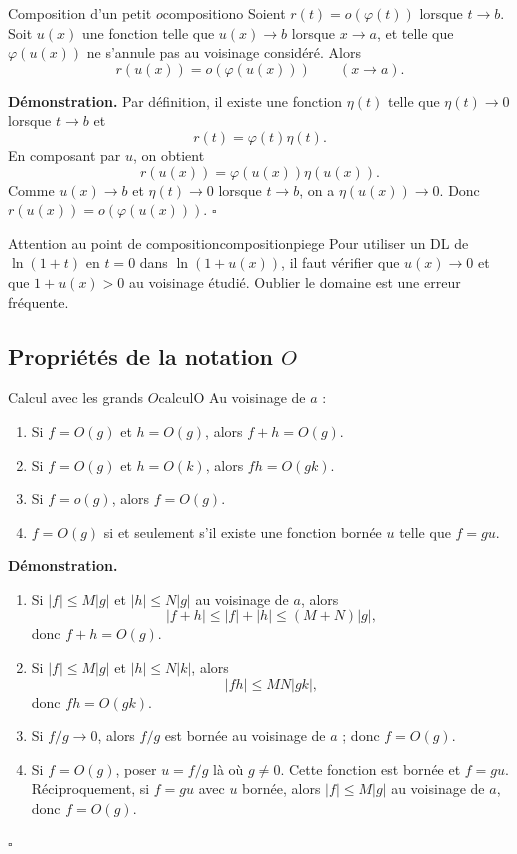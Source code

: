 \documentclass[11pt,a4paper]{article}
\begin{document}
\begin{propositionbox}{Composition d'un petit $o$}{compositiono}
Soient $r(t)=o(\varphi(t))$ lorsque $t\to b$. Soit $u(x)$ une fonction telle que $u(x)\to b$ lorsque $x\to a$, et telle que $\varphi(u(x))$ ne s'annule pas au voisinage considéré. Alors
\[
  r(u(x))=o(\varphi(u(x)))\qquad(x\to a).
\]
\end{propositionbox}

\textbf{Démonstration.} Par définition, il existe une fonction $\eta(t)$ telle que $\eta(t)\to0$ lorsque $t\to b$ et
\[
  r(t)=\varphi(t)\eta(t).
\]
En composant par $u$, on obtient
\[
  r(u(x))=\varphi(u(x))\eta(u(x)).
\]
Comme $u(x)\to b$ et $\eta(t)\to0$ lorsque $t\to b$, on a $\eta(u(x))\to0$. Donc $r(u(x))=o(\varphi(u(x)))$.
\hfill $\square$

\begin{warningbox}{Attention au point de composition}{compositionpiege}
Pour utiliser un DL de $\ln(1+t)$ en $t=0$ dans $\ln(1+u(x))$, il faut vérifier que $u(x)\to0$ et que $1+u(x)>0$ au voisinage étudié. Oublier le domaine est une erreur fréquente.
\end{warningbox}

\subsection{Propriétés de la notation $O$}

\begin{propositionbox}{Calcul avec les grands $O$}{calculO}
Au voisinage de $a$ :
\begin{enumerate}[label=\textup{(\roman*)}]
\item Si $f=O(g)$ et $h=O(g)$, alors $f+h=O(g)$.
\item Si $f=O(g)$ et $h=O(k)$, alors $fh=O(gk)$.
\item Si $f=o(g)$, alors $f=O(g)$.
\item $f=O(g)$ si et seulement s'il existe une fonction bornée $u$ telle que $f=gu$.
\end{enumerate}
\end{propositionbox}

\textbf{Démonstration.}
\begin{enumerate}[label=\textup{(\roman*)}]
\item Si $|f|\le M|g|$ et $|h|\le N|g|$ au voisinage de $a$, alors
\[
  |f+h|\le |f|+|h|\le (M+N)|g|,
\]
donc $f+h=O(g)$.
\item Si $|f|\le M|g|$ et $|h|\le N|k|$, alors
\[
  |fh|\le MN|gk|,
\]
donc $fh=O(gk)$.
\item Si $f/g\to0$, alors $f/g$ est bornée au voisinage de $a$ ; donc $f=O(g)$.
\item Si $f=O(g)$, poser $u=f/g$ là où $g\ne0$. Cette fonction est bornée et $f=gu$. Réciproquement, si $f=gu$ avec $u$ bornée, alors $|f|\le M|g|$ au voisinage de $a$, donc $f=O(g)$.
\end{enumerate}
\hfill $\square$
\end{document}
